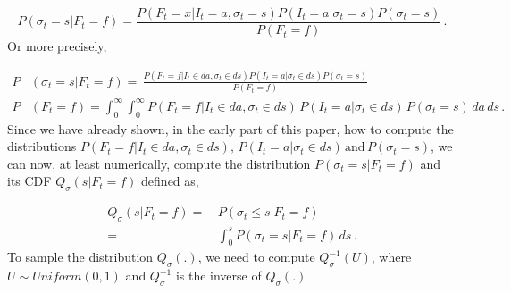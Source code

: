 \documentclass[12pt,oneside]{article}
\newcommand{\beqn}{\begin{equation}}
\newcommand{\eeqn}{\end{equation}}
\let\oin\in
\renewcommand{\in}{\!\oin\!}
\numberwithin{equation}{section}
\begin{document}
\beqn
P(\sigma_t=s|F_t=f)=\frac{P(F_t=x|I_t=a,\sigma_t=s)P(I_t=a|\sigma_t=s)P(\sigma_t=s)}{P(F_t=f)}\,.
\eeqn
Or more precisely,

\begin{subequations}
    \begin{align}
        P&(\sigma_t=s|F_t=f)=\,\frac{P(F_t=f|I_t\in da,\sigma_t\in ds)P(I_t=a|\sigma_t\in ds)P(\sigma_t=s)}{P(F_t=f)}\\
        P&(F_t=f)=\int_0^\infty \int_0^\infty P(F_t=f|I_t\in da,\sigma_t\in ds)\,P(I_t=a|\sigma_t\in ds)\,P(\sigma_t=s)\, da\,ds\,.
    \end{align}
\end{subequations}
Since we have already shown, in the early part of this paper, how to compute the distributions
$P(F_t=f|I_t\in da,\sigma_t\in ds),\,P(I_t=a|\sigma_t\in ds)\,\text{and}\,P(\sigma_t=s)$,
we can now, at least numerically, compute the distribution $P(\sigma_t=s|F_t=f)$ and
its CDF $Q_\sigma(s|F_t=f)$ defined as,

\beqn
\begin{aligned}
    Q_\sigma(s|F_t=f)=&\,P(\sigma_t\le s|F_t=f)\\
        =&\,\int_0^s P(\sigma_t=s|F_t=f)\,ds\,.
\end{aligned}
\eeqn
To sample the distribution $Q_\sigma(.)$, we need to compute $Q_\sigma^{-1}(U)$,
where $U\sim Uniform(0,1)$ and $Q_\sigma^{-1}$ is the inverse of $Q_\sigma(.)$
\end{document}
